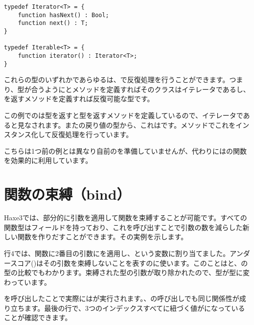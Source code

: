 \begin{lstlisting}
typedef Iterator<T> = {
	function hasNext() : Bool;
	function next() : T;
}

typedef Iterable<T> = {
	function iterator() : Iterator<T>;
}
\end{lstlisting}

これらの型のいずれかであらゆるは、で反復処理を行うことができます。つまり、型が合うようにとメソッドを定義すればそのクラスはイテレータであるし、を返すメソッドを定義すれば反復可能な型です。


この例でのは型を返すと型を返すメソッドを定義しているので、イテレータであると見なされます。またの戻り値の型から、これはです。メソッドでこれをインスタンス化して反復処理を行っています。


こちらは1つ前の例とは異なり自前のを準備していませんが、代わりにはの関数を効果的に利用しています。


\section{関数の束縛（bind）}
\label{lf-function-bindings}

Haxe3では、部分的に引数を適用して関数を束縛することが可能です。すべての関数型はフィールドを持っており、これを呼び出すことで引数の数を減らした新しい関数を作りだすことができます。その実例を示します。


行4では、関数に2番目の引数にを適用し、という変数に割り当てました。アンダースコア(\expr{_})はその引数を束縛しないことを表すのに使います。このことはと、の型の比較でもわかります。束縛された型の引数が取り除かれたので、型が型に変わっています。

を呼び出したことで実際にはが実行されます。、の呼び出しでも同じ関係性が成り立ちます。最後の行で、3つのインデックスすべてに紐づく値がになっていることが確認できます。

